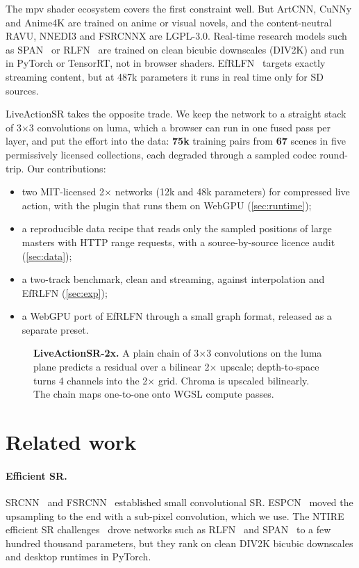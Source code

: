 \documentclass[10pt,twocolumn,letterpaper]{article}
\begin{document}
The mpv shader ecosystem covers the first constraint well. But ArtCNN, CuNNy and Anime4K are
trained on anime or visual novels, and the content-neutral RAVU, NNEDI3 and FSRCNNX are LGPL-3.0.
Real-time research models such as SPAN~\cite{span} or RLFN~\cite{rlfn} are trained on clean
bicubic downscales (DIV2K) and run in PyTorch or TensorRT, not in browser shaders. EfRLFN~\cite{efrlfn} targets exactly streaming content, but at 487k
parameters it runs in real time only for SD sources.

LiveActionSR takes the opposite trade. We keep the network to a straight stack of 3$\times$3
convolutions on luma, which a browser can run in one fused pass per layer, and put the effort into
the data: \textbf{75k} training pairs from \textbf{67} scenes in five permissively licensed
collections, each degraded through a sampled codec round-trip. Our contributions:

\begin{itemize}
\setlength\itemsep{0pt}
\item two MIT-licensed 2$\times$ networks (12k and 48k parameters) for compressed live action, with
the plugin that runs them on WebGPU (\cref{sec:runtime});
\item a reproducible data recipe that reads only the sampled positions of large masters with HTTP
range requests, with a source-by-source licence audit (\cref{sec:data});
\item a two-track benchmark, clean and streaming, against interpolation and EfRLFN
(\cref{sec:exp});
\item a WebGPU port of EfRLFN through a small graph format, released as a separate preset.
\end{itemize}

\begin{figure}[t]
  \centering
  \resizebox{0.86\textwidth}{!}{}
  \caption{\textbf{LiveActionSR-2x.} A plain chain of 3$\times$3 convolutions on the luma plane
  predicts a residual over a bilinear 2$\times$ upscale; depth-to-space~\cite{espcn} turns 4
  channels into the 2$\times$ grid. Chroma is upscaled bilinearly. The chain maps one-to-one onto
  WGSL compute passes.}
  \label{fig:arch}
\end{figure}

\section{Related work}

\paragraph{Efficient SR.} SRCNN~\cite{srcnn} and FSRCNN~\cite{fsrcnn} established small
convolutional SR. ESPCN~\cite{espcn} moved the upsampling to the end with a sub-pixel
convolution, which we use. The NTIRE efficient SR challenges~\cite{ntire24} drove networks such
as RLFN~\cite{rlfn} and SPAN~\cite{span} to a few hundred thousand parameters, but they rank on
clean DIV2K bicubic downscales and desktop runtimes in PyTorch.
\end{document}
